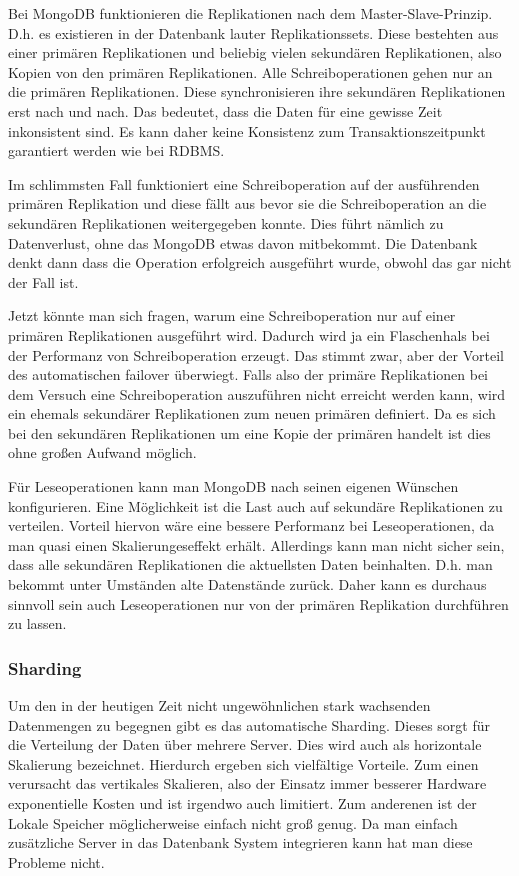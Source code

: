 Bei MongoDB funktionieren die Replikationen nach dem Master-Slave-Prinzip. \cite{mongodb:replication}
D.h. es existieren in der Datenbank lauter Replikationssets. Diese bestehten
aus einer primären Replikationen und beliebig vielen sekundären Replikationen, also Kopien von den
primären Replikationen. Alle Schreiboperationen gehen nur an die primären Replikationen. Diese synchronisieren ihre sekundären
Replikationen erst nach und nach. Das bedeutet, dass die Daten für eine gewisse Zeit
inkonsistent sind. Es kann daher keine Konsistenz zum Transaktionszeitpunkt garantiert werden wie bei RDBMS.

Im schlimmsten Fall funktioniert eine Schreiboperation auf der ausführenden primären Replikation und
diese fällt aus bevor sie die Schreiboperation an die sekundären Replikationen
weitergegeben konnte. Dies führt nämlich zu Datenverlust, ohne das MongoDB
etwas davon mitbekommt. Die Datenbank denkt dann dass die Operation
erfolgreich ausgeführt wurde, obwohl das gar nicht der Fall ist.

Jetzt könnte man sich fragen, warum eine Schreiboperation nur auf einer primären Replikationen ausgeführt wird.
Dadurch wird ja ein Flaschenhals bei der Performanz von Schreiboperation erzeugt.
Das stimmt zwar, aber der Vorteil des automatischen failover überwiegt. Falls also
der primäre Replikationen bei dem Versuch eine Schreiboperation auszuführen nicht erreicht werden kann,
wird ein ehemals sekundärer Replikationen zum neuen primären definiert. Da es sich bei den sekundären Replikationen
um eine Kopie der primären handelt ist dies ohne großen Aufwand möglich.

Für Leseoperationen kann man MongoDB nach seinen eigenen Wünschen konfigurieren. \cite{mongodb:replication}
Eine Möglichkeit ist die Last auch auf sekundäre Replikationen zu verteilen.
Vorteil hiervon wäre eine bessere Performanz bei Leseoperationen, da man quasi einen
Skalierungeseffekt erhält. Allerdings kann man nicht sicher
sein, dass alle sekundären Replikationen die aktuellsten Daten beinhalten.
D.h. man bekommt unter Umständen alte Datenstände zurück. Daher kann es durchaus sinnvoll sein
auch Leseoperationen nur von der primären Replikation durchführen zu lassen.

\subsubsection{Sharding}
Um den in der heutigen Zeit nicht ungewöhnlichen stark wachsenden Datenmengen
zu begegnen gibt es das automatische Sharding. Dieses sorgt für die
Verteilung der Daten über mehrere Server. Dies wird auch als
horizontale Skalierung bezeichnet. Hierdurch ergeben sich vielfältige Vorteile. Zum
einen verursacht das vertikales Skalieren, also der Einsatz immer
besserer Hardware exponentielle Kosten und ist irgendwo auch limitiert. Zum anderenen ist der Lokale
Speicher möglicherweise einfach nicht groß genug. Da man einfach zusätzliche Server
in das Datenbank System integrieren kann hat man diese Probleme nicht.

